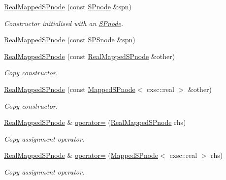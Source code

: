 \begin{DoxyCompactItemize}
\hyperlink{classsubpavings_1_1RealMappedSPnode_add6e4bba67a9d900ebebf07f420ad813}{\-Real\-Mapped\-S\-Pnode} (const \hyperlink{classsubpavings_1_1SPnode}{\-S\-Pnode} \&spn)
\begin{DoxyCompactList}\small\item\em \-Constructor initialised with an \hyperlink{classsubpavings_1_1SPnode}{\-S\-Pnode}. \end{DoxyCompactList}\item 
\hyperlink{classsubpavings_1_1RealMappedSPnode_a4ec458c112685446a703ae73fe812b84}{\-Real\-Mapped\-S\-Pnode} (const \hyperlink{classsubpavings_1_1SPSnode}{\-S\-P\-Snode} \&spn)
\item 
\hyperlink{classsubpavings_1_1RealMappedSPnode_aea3c023626616315bdf71aaee45fa32f}{\-Real\-Mapped\-S\-Pnode} (const \hyperlink{classsubpavings_1_1RealMappedSPnode}{\-Real\-Mapped\-S\-Pnode} \&other)
\begin{DoxyCompactList}\small\item\em \-Copy constructor. \end{DoxyCompactList}\item 
\hyperlink{classsubpavings_1_1RealMappedSPnode_afcd2676e416102b713d9ce735bc27889}{\-Real\-Mapped\-S\-Pnode} (const \hyperlink{classsubpavings_1_1MappedSPnode}{\-Mapped\-S\-Pnode}$<$ cxsc\-::real $>$ \&other)
\begin{DoxyCompactList}\small\item\em \-Copy constructor. \end{DoxyCompactList}\item 
\hyperlink{classsubpavings_1_1RealMappedSPnode}{\-Real\-Mapped\-S\-Pnode} \& \hyperlink{classsubpavings_1_1RealMappedSPnode_a8c4a201d04c81a5f21301d6a325e740d}{operator=} (\hyperlink{classsubpavings_1_1RealMappedSPnode}{\-Real\-Mapped\-S\-Pnode} rhs)
\begin{DoxyCompactList}\small\item\em \-Copy assignment operator. \end{DoxyCompactList}\item 
\hyperlink{classsubpavings_1_1RealMappedSPnode}{\-Real\-Mapped\-S\-Pnode} \& \hyperlink{classsubpavings_1_1RealMappedSPnode_ad6a86d365ae237d96c7a8f842700af96}{operator=} (\hyperlink{classsubpavings_1_1MappedSPnode}{\-Mapped\-S\-Pnode}$<$ cxsc\-::real $>$ rhs)
\begin{DoxyCompactList}\small\item\em \-Copy assignment operator. \end{DoxyCompactList}\item 

\end{DoxyCompactItemize}
